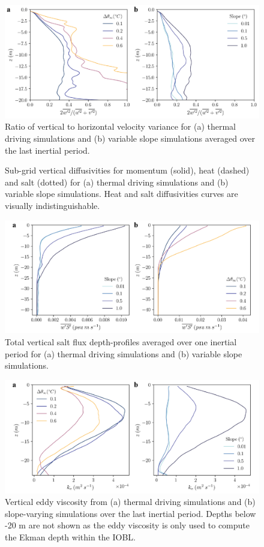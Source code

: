 \documentclass[tc, manuscript]{copernicus}
\begin{document}
\begin{figure}[t]
\includegraphics[width=12cm]{figS3.pdf}
\caption{Ratio of vertical to horizontal velocity variance for (a) thermal driving simulations and (b) variable slope simulations averaged over the last inertial period.}
\label{fig:vel_var_ratio}
\end{figure}

\begin{figure}[t]
\caption{Sub-grid vertical diffusivities for momentum (solid), heat (dashed) and salt (dotted) for (a) thermal driving simulations and (b) variable slope simulations. Heat and salt diffusivities curves are visually indistinguishable.}
\label{fig:k_all}
\end{figure}

\begin{figure}[t]
\includegraphics[width=12cm]{figS5.pdf}
\caption{Total vertical salt flux depth-profiles averaged over one inertial period for (a) thermal driving simulations and (b) variable slope simulations.}
\label{fig:saltflux}
\end{figure}%

\begin{figure}[t]
\includegraphics[width=12cm]{figS6.pdf}
\caption{Vertical eddy viscosity from (a) thermal driving simulations and (b) slope-varying simulations over the last inertial period. Depths below -20 m are not shown as the eddy viscosity is only used to compute the Ekman depth within the IOBL. }
\label{fig:km}
\end{figure}
\end{document}
